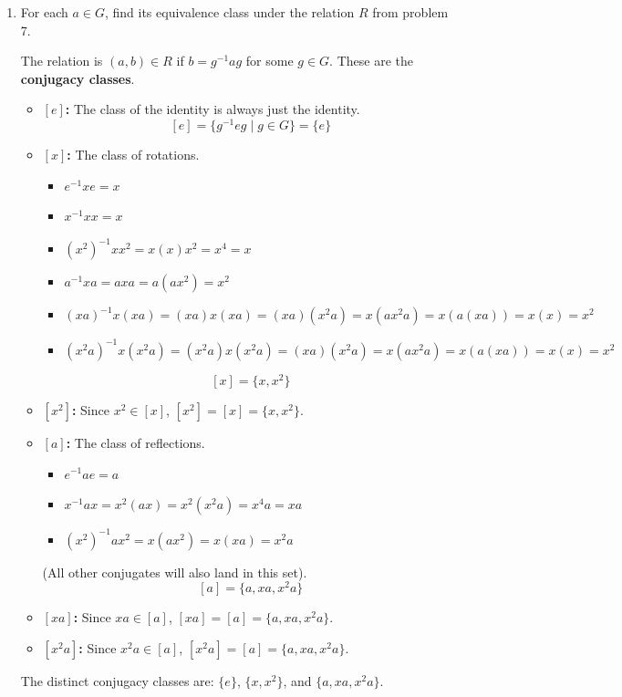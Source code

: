 \begin{enumerate}
\begin{enumerate}
    \item For each $a \in G$, find its equivalence class under the relation $R$ from problem 7.
    \begin{subanswer}
      The relation is $(a, b) \in R$ if $b = g^{-1} a g$ for some $g \in G$. These are the \textbf{conjugacy classes}.
      \begin{itemize}
        \item \textbf{$[e]$:} The class of the identity is always just the identity.
          \[ [e] = \{g^{-1}eg \mid g \in G\} = \{e\} \]
        \item \textbf{$[x]$:} The class of rotations.
          \begin{itemize}
            \item $e^{-1}xe = x$
            \item $x^{-1}xx = x$
            \item $(x^2)^{-1}xx^2 = x(x)x^2 = x^4 = x$
            \item $a^{-1}xa = axa = a(ax^2) = x^2$
            \item $(xa)^{-1}x(xa) = (xa)x(xa) = (xa)(x^2a) = x(a x^2 a) = x(a(xa)) = x(x) = x^2$
            \item $(x^2a)^{-1}x(x^2a) = (x^2a)x(x^2a) = (xa)(x^2a) = x(ax^2a) = x(a(xa)) = x(x) = x^2$
          \end{itemize}
          \[ [x] = \{x, x^2\} \]
        \item \textbf{$[x^2]$:} Since $x^2 \in [x]$, $[x^2] = [x] = \{x, x^2\}$.
        \item \textbf{$[a]$:} The class of reflections.
          \begin{itemize}
            \item $e^{-1}ae = a$
            \item $x^{-1}ax = x^2(ax) = x^2(x^2a) = x^4a = xa$
            \item $(x^2)^{-1}ax^2 = x(ax^2) = x(xa) = x^2a$
          \end{itemize}
          (All other conjugates will also land in this set).
          \[ [a] = \{a, xa, x^2a\} \]
        \item \textbf{$[xa]$:} Since $xa \in [a]$, $[xa] = [a] = \{a, xa, x^2a\}$.
        \item \textbf{$[x^2a]$:} Since $x^2a \in [a]$, $[x^2a] = [a] = \{a, xa, x^2a\}$.
      \end{itemize}
      The distinct conjugacy classes are: $\{e\}$, $\{x, x^2\}$, and $\{a, xa, x^2a\}$.
    \end{subanswer}
  \end{enumerate}
  


\end{enumerate}
